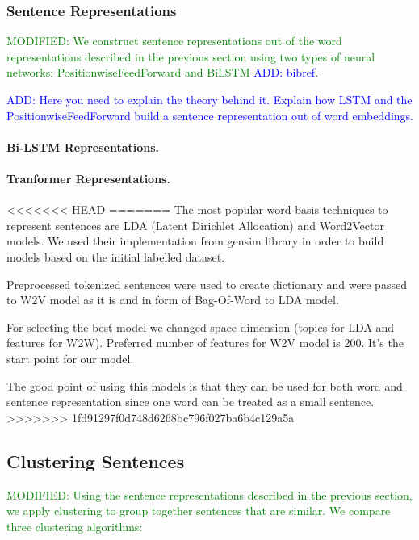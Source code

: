 \documentclass[11pt]{article}
\newcommand\add[1]{{\textcolor{blue}{ADD: #1}}}
\newcommand\mod[1]{{\textcolor{green}{MODIFIED: #1}}}
\begin{document}
\subsubsection{Sentence Representations}

\mod{We construct sentence representations out of the word representations described in the previous section using two types of neural networks:  PositionwiseFeedForward \cite{vaswani2017attention} and BiLSTM \add{bibref}}.

\add{Here you need to explain the theory behind it. Explain how LSTM and the PositionwiseFeedForward  build a sentence representation out of word embeddings.}

\paragraph{Bi-LSTM Representations.}


\paragraph{Tranformer Representations.}

<<<<<<< HEAD
=======
The most popular word-basis techniques to represent sentences are LDA (Latent Dirichlet Allocation) and Word2Vector models. We used their implementation from gensim library in order to build models based on the initial labelled dataset.

Preprocessed tokenized sentences were used to create dictionary and were passed to W2V model as it is and in form of Bag-Of-Word to LDA model.

For selecting the best model we changed space dimension (topics for LDA and features for W2W). Preferred number of features for W2V model is 200. It's the start point for our model.

The good point of using this models is that they can be used for both word and sentence representation since one word can be treated as a small sentence.
>>>>>>> 1fd91297f0d748d6268bc796f027ba6b4c129a5a



\subsection{Clustering Sentences}

\mod{Using the sentence representations described in the previous
  section, we apply clustering to group together sentences that are
  similar. We compare three clustering algorithms:}
\end{document}
